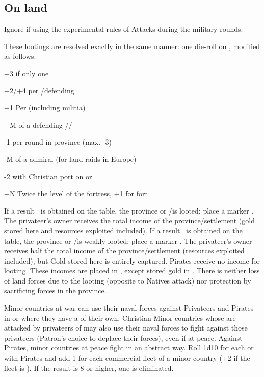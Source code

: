 \subsection{On land}
\begin{designnote}
  Ignore if using the experimental rules of Attacks during the military
  rounds.
\end{designnote}

 These lootings are resolved
exactly in the same manner: one die-roll on , modified as follows:
\begin{modlist}
\item[+3] if only one \corsaire\facemoins
\item[+2/+4] per \ARMY\facemoins/\Faceplus defending
\item[+1] Per \LD (including militia) %
\item[+M] \Man of a defending \LeaderG/\LeaderC/\LeaderGov
\item[-1] per round in province (max. -3) %
\item[-M] \Man of a \corsaire admiral (\textonehalf for land raids in Europe)
\item[-2]  with Christian port on  or
\item[+N] Twice the level of the fortress, +1 for fort
\end{modlist}
\bparag If a result \textddag\ is obtained on the table, the province or
\TP/\COL is looted: place a marker \PILLAGE\faceplus. The privateer's owner
receives the total income of the province/settlement (gold stored here and
resources exploited included).
\bparag If a result \textdag\ is obtained on the table, the province or
\TP/\COL is weakly looted: place a marker \PILLAGE\facemoins. The privateer's
owner receives half the total income of the province/settlement (resources
exploited included), but Gold stored here is entirely captured.
\bparag Pirates receive no income for looting.
\bparag These incomes are placed in , except
stored gold in .
\bparag There is neither loss of land forces due to the looting (opposite to
Natives attack) nor protection by sacrificing forces in the province.

\bparag Minor countries at war can use their naval forces against Privateers
and Pirates in \STZ or \CTZ where they have a \TradeFLEET of their own.
\bparag Christian Minor countries whose \TradeFLEET are attacked by privateers
of \Barbaresques may also use their naval forces to fight against those
privateers (Patron's choice to deplace their forces), even if at peace.
\bparag Against Pirates, minor countries at peace fight in an abstract way.
Roll 1d10 for each \STZ or \CTZ with Pirates and add 1 for each commercial
fleet of a minor country (+2 if the fleet is \Faceplus).  If the result is 8
or higher, one \corsaire\facemoins is eliminated.



